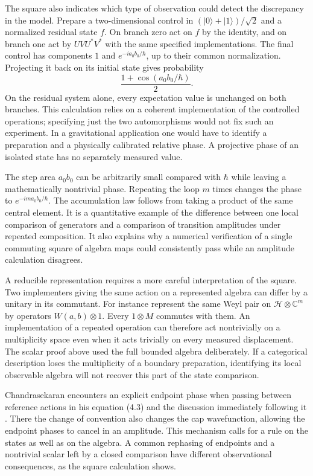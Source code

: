 \documentclass[11pt,letterpaper]{article}
\newcommand{\CC}{\mathbb C}
\begin{document}
The square also indicates which type of observation could detect the discrepancy in the model.
Prepare a two-dimensional control in $(|0\rangle+|1\rangle)/\sqrt2$ and a normalized residual
state $f$. On branch zero act on $f$ by the identity, and on branch one act by $UVU^*V^*$ with
the same specified implementations. The final control has components $1$ and $e^{-ia_0
b_0/\hbar}$, up to their common normalization. Projecting it back on its initial state gives
probability
\[
 \frac{1+\cos(a_0 b_0/\hbar)}{2}.
\]
On the residual system alone, every expectation value is unchanged on both branches. This
calculation relies on a coherent implementation of the controlled operations; specifying just
the two automorphisms would not fix such an experiment. In a gravitational application one
would have to identify a preparation and a physically calibrated relative phase. A projective
phase of an isolated state has no separately measured value.

The step area $a_0 b_0$ can be arbitrarily small compared with $\hbar$ while leaving a
mathematically nontrivial phase. Repeating the loop $m$ times changes the phase to $e^{-im a_0
b_0/\hbar}$. The accumulation law follows from taking a product of the same central element. It
is a quantitative example of the difference between one local comparison of generators and a
comparison of transition amplitudes under repeated composition. It also explains why a
numerical verification of a single commuting square of algebra maps could consistently pass
while an amplitude calculation disagrees.

A reducible representation requires a more careful interpretation of the square. Two
implementers giving the same action on a represented algebra can differ by a unitary in its
commutant. For instance represent the same Weyl pair on $\mathcal H\otimes\CC^m$ by operators
$W(a,b)\otimes 1$. Every $1\otimes M$ commutes with them. An implementation of a repeated
operation can therefore act nontrivially on a multiplicity space even when it acts trivially on
every measured displacement. The scalar proof above used the full bounded algebra deliberately.
If a categorical description loses the multiplicity of a boundary preparation, identifying its
local observable algebra will not recover this part of the state comparison.

Chandrasekaran encounters an explicit endpoint phase when passing between reference actions in
his equation (4.3) and the discussion immediately following it \cite{nc}. There the change of
convention also changes the cap wavefunction, allowing the endpoint phases to cancel in an
amplitude. This mechanism calls for a rule on the states as well as on the algebra. A common
rephasing of endpoints and a nontrivial scalar left by a closed comparison have different
observational consequences, as the square calculation shows.
\end{document}

